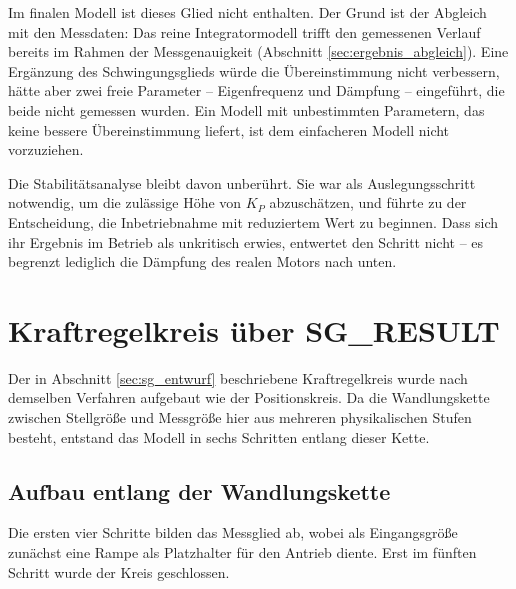 Im finalen Modell ist dieses Glied nicht enthalten. Der Grund ist der Abgleich mit den
Messdaten: Das reine Integratormodell trifft den gemessenen Verlauf bereits im Rahmen der
Messgenauigkeit (Abschnitt \ref{sec:ergebnis_abgleich}). Eine Ergänzung des
Schwingungsglieds würde die Übereinstimmung nicht verbessern, hätte aber zwei freie
Parameter -- Eigenfrequenz und Dämpfung -- eingeführt, die beide nicht gemessen wurden.
Ein Modell mit unbestimmten Parametern, das keine bessere Übereinstimmung liefert, ist dem
einfacheren Modell nicht vorzuziehen.

Die Stabilitätsanalyse bleibt davon unberührt. Sie war als Auslegungsschritt notwendig,
um die zulässige Höhe von $K_P$ abzuschätzen, und führte zu der Entscheidung, die
Inbetriebnahme mit reduziertem Wert zu beginnen. Dass sich ihr Ergebnis im Betrieb als
unkritisch erwies, entwertet den Schritt nicht -- es begrenzt lediglich die Dämpfung des
realen Motors nach unten.

\section{Kraftregelkreis über SG\_RESULT}
\label{sec:sim_sg}

Der in Abschnitt \ref{sec:sg_entwurf} beschriebene Kraftregelkreis wurde nach demselben
Verfahren aufgebaut wie der Positionskreis. Da die Wandlungskette zwischen Stellgröße und
Messgröße hier aus mehreren physikalischen Stufen besteht, entstand das Modell in sechs
Schritten entlang dieser Kette.

\subsection*{Aufbau entlang der Wandlungskette}

Die ersten vier Schritte bilden das Messglied ab, wobei als Eingangsgröße zunächst eine
Rampe als Platzhalter für den Antrieb diente. Erst im fünften Schritt wurde der Kreis
geschlossen.

